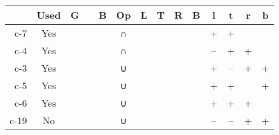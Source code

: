 \begin{tabular}[pos]{ | r | c | c | c | c | c | c | c | c | c | c | c | c | c | }
\hline
 & {\mktsStyleBold{}Used} & {\mktsStyleBold{}G} &  & {\mktsStyleBold{}B} & {\mktsStyleBold{}Op} & {\mktsStyleBold{}L} & {\mktsStyleBold{}T} & {\mktsStyleBold{}R} & {\mktsStyleBold{}B} & {\mktsStyleBold{}l} & {\mktsStyleBold{}t} & {\mktsStyleBold{}r} & {\mktsStyleBold{}b}\\

\hline
{\mktsStyleBold{}c-7} & Yes & \cjkgGlue{\cjk{}\cjkgGlue{\cnjzr{}}\cjkgGlue{}}\cjkgGlue{} &  & \cjkgGlue{\cjk{}\cjkgGlue{\cnjzr{}}\cjkgGlue{}}\cjkgGlue{} & {\mktsRsgFb{}∩} & \cjkgGlue{\cjk{}\cjkgGlue{\cnjzr{}}\cjkgGlue{}}\cjkgGlue{} & \cjkgGlue{\cjk{}\cjkgGlue{\cnjzr{}}\cjkgGlue{}}\cjkgGlue{} &  &  & + & + &  & \\
{\mktsStyleBold{}c-4} & Yes & \cjkgGlue{\cjk{}\cjkgGlue{\cnjzr{}}\cjkgGlue{}}\cjkgGlue{} & \cjkgGlue{\cjk{}\cjkgGlue{\cnjzr{}}\cjkgGlue{}\cjkgGlue{\cnjzr{}}\cjkgGlue{}}\cjkgGlue{} & \cjkgGlue{\cjk{}\cjkgGlue{\cnjzr{}}\cjkgGlue{}}\cjkgGlue{} & {\mktsRsgFb{}∩} &  & \cjkgGlue{\cjk{}\cjkgGlue{\cnjzr{}}\cjkgGlue{}}\cjkgGlue{} & \cjkgGlue{\cjk{}\cjkgGlue{\cnjzr{}}\cjkgGlue{}}\cjkgGlue{} &  & – & + & + & \\
{\mktsStyleBold{}c-3} & Yes & \cjkgGlue{\cjk{}\cjkgGlue{\cnjzr{}}\cjkgGlue{}}\cjkgGlue{} & \cjkgGlue{\cjk{}\cjkgGlue{\cnjzr{}}\cjkgGlue{}\cjkgGlue{\cnjzr{}}\cjkgGlue{}}\cjkgGlue{} & \cjkgGlue{\cjk{}\cjkgGlue{\cnjzr{}}\cjkgGlue{}}\cjkgGlue{} & {\mktsRsgFb{}∪} & \cjkgGlue{\cjk{}\cjkgGlue{\cnjzr{}}\cjkgGlue{}}\cjkgGlue{} &  &  & \cjkgGlue{\cjk{}\cjkgGlue{\cnjzr{}}\cjkgGlue{}}\cjkgGlue{} & + & – & + & +\\
{\mktsStyleBold{}c-5} & Yes & \cjkgGlue{\cjk{}\cjkgGlue{\cnjzr{}}\cjkgGlue{}}\cjkgGlue{} &  & \cjkgGlue{\cjk{}\cjkgGlue{\cnjzr{}}\cjkgGlue{}}\cjkgGlue{} & {\mktsRsgFb{}∪} & \cjkgGlue{\cjk{}\cjkgGlue{\cnjzr{}}\cjkgGlue{}}\cjkgGlue{} & \cjkgGlue{\cjk{}\cjkgGlue{\cnjzr{}}\cjkgGlue{}}\cjkgGlue{} &  &  & + & + &  & +\\
{\mktsStyleBold{}c-6} & Yes & \cjkgGlue{\cjk{}\cjkgGlue{\cnjzr{}}\cjkgGlue{}}\cjkgGlue{} &  & \cjkgGlue{\cjk{}\cjkgGlue{\cnjzr{}}\cjkgGlue{}}\cjkgGlue{} & {\mktsRsgFb{}∪} &  & \cjkgGlue{\cjk{}\cjkgGlue{\cnjzr{}}\cjkgGlue{}}\cjkgGlue{} & \cjkgGlue{\cjk{}\cjkgGlue{\cnjzr{}}\cjkgGlue{}}\cjkgGlue{} &  & + & + & + & \\
{\mktsStyleBold{}c-19} & No & \cjkgGlue{\cjk{}\cjkgGlue{\cnjzr{}}\cjkgGlue{}}\cjkgGlue{} &  & \cjkgGlue{\cjk{}\cjkgGlue{\cnjzr{}}\cjkgGlue{}}\cjkgGlue{} & {\mktsRsgFb{}∪} &  &  & \cjkgGlue{\cjk{}\cjkgGlue{\cnjzr{}}\cjkgGlue{}}\cjkgGlue{} & \cjkgGlue{\cjk{}\cjkgGlue{\cnjzr{}}\cjkgGlue{}}\cjkgGlue{} & – & – & + & +\\

\end{tabular}
